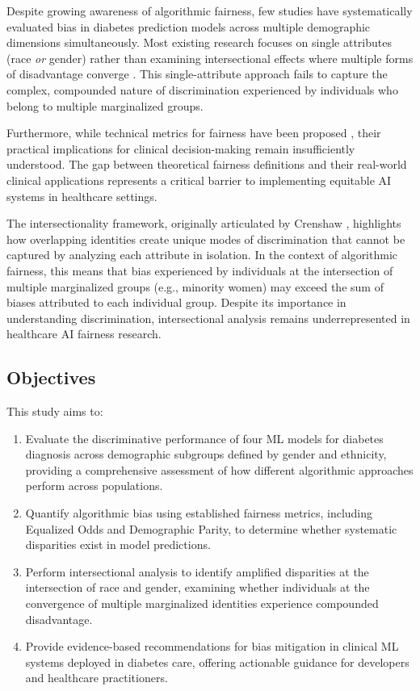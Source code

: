 Despite growing awareness of algorithmic fairness, few studies have 
systematically evaluated bias in diabetes prediction models across multiple 
demographic dimensions simultaneously. Most existing research focuses on 
single attributes (race \textit{or} gender) rather than examining 
intersectional effects where multiple forms of disadvantage converge 
\cite{crenshaw1989, buolamwini2018}. This single-attribute approach fails 
to capture the complex, compounded nature of discrimination experienced 
by individuals who belong to multiple marginalized groups.

Furthermore, while technical metrics for fairness have been proposed 
\cite{corbett2018}, their practical implications for clinical 
decision-making remain insufficiently understood. The gap between 
theoretical fairness definitions and their real-world clinical applications 
represents a critical barrier to implementing equitable AI systems in 
healthcare settings.

The intersectionality framework, originally articulated by Crenshaw 
\cite{crenshaw1989}, highlights how overlapping identities create unique 
modes of discrimination that cannot be captured by analyzing each attribute 
in isolation. In the context of algorithmic fairness, this means that bias 
experienced by individuals at the intersection of multiple marginalized 
groups (e.g., minority women) may exceed the sum of biases attributed to 
each individual group. Despite its importance in understanding 
discrimination, intersectional analysis remains underrepresented in 
healthcare AI fairness research.

\subsection{Objectives}

This study aims to:

\begin{enumerate}[leftmargin=*]
    \item Evaluate the discriminative performance of four ML models for 
          diabetes diagnosis across demographic subgroups defined by gender 
          and ethnicity, providing a comprehensive assessment of how different 
          algorithmic approaches perform across populations.
    \item Quantify algorithmic bias using established fairness metrics, 
          including Equalized Odds and Demographic Parity, to determine 
          whether systematic disparities exist in model predictions.
    \item Perform intersectional analysis to identify amplified disparities 
          at the intersection of race and gender, examining whether 
          individuals at the convergence of multiple marginalized identities 
          experience compounded disadvantage.
    \item Provide evidence-based recommendations for bias mitigation in 
          clinical ML systems deployed in diabetes care, offering actionable 
          guidance for developers and healthcare practitioners.
\end{enumerate}

